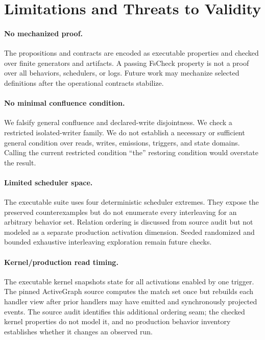 \section{Limitations and Threats to Validity}
\label{sec:limitations}

\paragraph{No mechanized proof.}
The propositions and contracts are encoded as executable properties and checked over finite
generators and artifacts.  A passing FsCheck property is not a proof over all
behaviors, schedulers, or logs.  Future work may mechanize selected definitions
after the operational contracts stabilize.

\paragraph{No minimal confluence condition.}
We falsify general confluence and declared-write disjointness.  We check a
restricted isolated-writer family.  We do not establish a necessary or
sufficient general condition over reads, writes, emissions, triggers, and state
domains.  Calling the current restricted condition ``the'' restoring condition
would overstate the result.

\paragraph{Limited scheduler space.}
The executable suite uses four deterministic scheduler extremes.  They expose
the preserved counterexamples but do not enumerate every interleaving for an
arbitrary behavior set.  Relation ordering is discussed from source audit but
not modeled as a separate production activation dimension.  Seeded randomized
and bounded exhaustive interleaving exploration remain future checks.

\paragraph{Kernel/production read timing.}
The executable kernel snapshots state for all activations enabled by one
trigger.  The pinned ActiveGraph source computes the match set once but rebuilds
each handler view after prior handlers may have emitted and synchronously
projected events.  The source audit identifies this additional ordering seam;
the checked kernel properties do not model it, and no production behavior
inventory establishes whether it changes an observed run.

